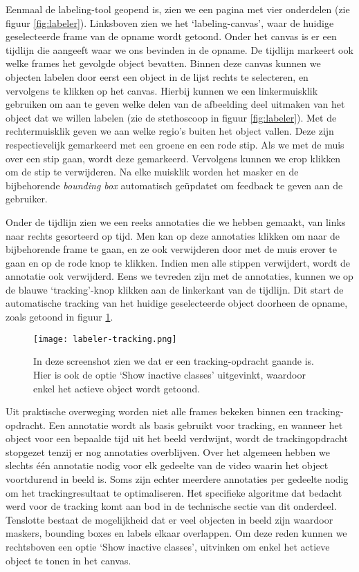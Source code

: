 Eenmaal de labeling-tool geopend is, zien we een pagina met vier onderdelen (zie figuur \ref{fig:labeler}).
Linksboven zien we het `labeling-canvas', waar de huidige geselecteerde frame van de opname wordt getoond. Onder het canvas is er een tijdlijn die aangeeft waar we ons bevinden in de opname. De tijdlijn markeert ook welke frames het gevolgde object bevatten. 
Binnen deze canvas kunnen we objecten labelen door eerst een object in de lijst rechts te selecteren, en vervolgens te klikken op het canvas.
Hierbij kunnen we een linkermuisklik gebruiken om aan te geven welke delen van de afbeelding deel uitmaken van het object dat we willen labelen (zie de stethoscoop in figuur \ref{fig:labeler}). Met de rechtermuisklik geven we aan welke regio's buiten het object vallen.
Deze zijn respectievelijk gemarkeerd met een groene en een rode stip. Als we met de muis over een stip gaan, wordt deze gemarkeerd. Vervolgens kunnen we erop klikken om de stip te verwijderen.
Na elke muisklik worden het masker en de bijbehorende \textit{bounding box} automatisch geüpdatet om feedback te geven aan de gebruiker.

Onder de tijdlijn zien we een reeks annotaties die we hebben gemaakt, van links naar rechts gesorteerd op tijd. Men kan op deze annotaties klikken om naar de bijbehorende frame te gaan, en ze ook verwijderen door met de muis erover te gaan en op de rode knop te klikken.
Indien men alle stippen verwijdert, wordt de annotatie ook verwijderd.
Eens we tevreden zijn met de annotaties, kunnen we op de blauwe `tracking'-knop klikken aan de linkerkant van de tijdlijn.
Dit start de automatische tracking van het huidige geselecteerde object doorheen de opname, zoals getoond in figuur \ref{fig:labeler-tracking}. 

\begin{figure}[H]
  \centering
  \texttt{[image: labeler-tracking.png]}
  \caption[
    Screenshot van de labeling-tool tijdens een tracking-opdracht
  ]{\label{fig:labeler-tracking} In deze screenshot zien we dat er een tracking-opdracht gaande is. Hier is ook de optie `Show inactive classes' uitgevinkt, waardoor enkel het actieve object wordt getoond. }
\end{figure}

Uit praktische overweging worden niet alle frames bekeken binnen een tracking-opdracht. Een annotatie wordt als basis gebruikt voor tracking, en wanneer het object voor een bepaalde tijd uit het beeld verdwijnt, wordt de trackingopdracht stopgezet tenzij er nog annotaties overblijven.
Over het algemeen hebben we slechts één annotatie nodig voor elk gedeelte van de video waarin het object voortdurend in beeld is. Soms zijn echter meerdere annotaties per gedeelte nodig om het trackingresultaat te optimaliseren.
Het specifieke algoritme dat bedacht werd voor de tracking komt aan bod in de technische sectie van dit onderdeel.
Tenslotte bestaat de mogelijkheid dat er veel objecten in beeld zijn waardoor maskers, bounding boxes en labels elkaar overlappen. Om deze reden kunnen we rechtsboven een optie `Show inactive classes', uitvinken om enkel het actieve object te tonen in het canvas.

